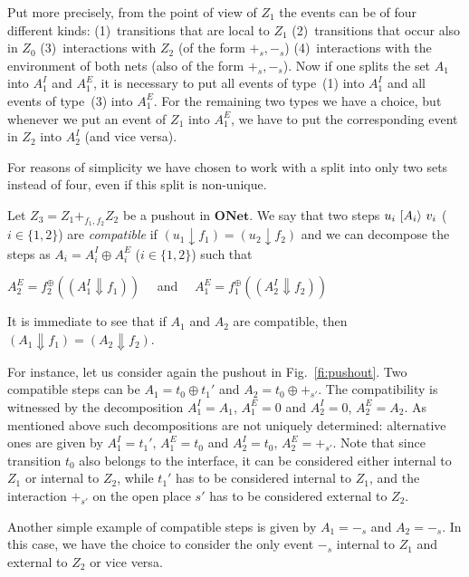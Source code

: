 \documentclass{LMCS}
\newcommand{\monSub}[2]{\ensuremath{{#1}_{#2}^\oplus}}
\newcommand{\res}[2]{\ensuremath{({#1}\!\downarrow\!{#2})}}
\newcommand{\sres}[2]{\ensuremath{({#1}\!\Downarrow\!{#2})}}
\newcommand{\trans}[1]{\ensuremath{\ [\/{#1}\/\rangle}\ }
\newcommand{\onet}{\ensuremath{\mathbf{ONet}}}
\begin{document}
Put more precisely, from the point of view of $Z_1$ the events can be
of four different kinds: (1)~transitions that are local to $Z_1$
(2)~transitions that occur also in $Z_0$ (3)~interactions with $Z_2$
(of the form $+_s,-_s$) (4)~interactions with the environment of both
nets (also of the form $+_s,-_s$). Now if one splits the set $A_1$
into $A_1^I$ and $A_1^E$, it is necessary to put all events of
type~(1) into $A_1^I$ and all events of type~(3) into $A_1^E$. For the
remaining two types we have a choice, but whenever we put an event of
$Z_1$ into $A_1^E$, we have to put the corresponding event in $Z_2$
into $A_2^I$ (and vice versa).

For reasons of simplicity we have chosen to work with a split into
only two sets instead of four, even if this split is non-unique.

\begin{defi}
  \label{de:compatible-steps}
  Let $Z_3 = Z_1 +_{f_1,f_2} Z_2$ be a pushout in $\onet$.
We say that two steps $u_i \trans{A_i} v_i$ ($i \in \{1,2\}$) are
  \emph{compatible} if $\res{u_1}{f_1} = \res{u_2}{f_2}$ and we can
  decompose the steps as $A_i = A_i^I \oplus A_i^E$ ($i \in \{1,2\}$)
  such that
  \begin{center}
    $A_2^E = \monSub{f}{2}(\sres{A_1^I}{f_1})$ \ \ and \ \
    $A_1^E = \monSub{f}{1}(\sres{A_2^I}{f_2})$
  \end{center}
\end{defi}

It is immediate to see that if $A_1$ and $A_2$ are compatible, then
$\sres{A_1}{f_1} = \sres{A_2}{f_2}$.

For instance, let us consider again the pushout in
Fig.~\ref{fi:pushout}. Two compatible steps can be $A_1 = t_0 \oplus
t_1'$ and $A_2 = t_0 \oplus +_{s'}$. The compatibility is
witnessed by the decomposition $A_1^I = A_1$, $A_1^E=0$ and $A_2^I =
0$, $A_2^E = A_2$. As mentioned above such decompositions are not uniquely determined: 
alternative ones are given by $A_1^I = t_1'$, $A_1^E=t_0$ and $A_2^I =
t_0$, $A_2^E = +_{s'}$.
Note that since transition $t_0$ also belongs to the interface,
it can be considered either internal to $Z_1$ or internal to $Z_2$,
while $t_1'$ has to be considered internal to $Z_1$, and the interaction
$+_{s'}$ on the open place $s'$ has to be considered external to $Z_2$.

Another simple example of compatible steps is given by $A_1 = -_s$
and $A_2 = -_s$. In this case, we have the choice to consider the only
event $-_s$ internal to $Z_1$ and external to $Z_2$ or vice versa.
\end{document}
